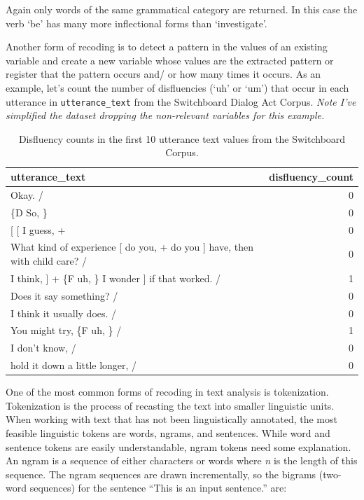 \documentclass[
]{article}
\begin{document}
Again only words of the same grammatical category are returned. In this case the verb `be' has many more inflectional forms than `investigate'.

Another form of recoding is to detect a pattern in the values of an existing variable and create a new variable whose values are the extracted pattern or register that the pattern occurs and/ or how many times it occurs. As an example, let's count the number of disfluencies (`uh' or `um') that occur in each utterance in \texttt{utterance\_text} from the Switchboard Dialog Act Corpus. \emph{Note I've simplified the dataset dropping the non-relevant variables for this example.}

\begin{table}

\caption{\label{tab:recoding-extract-switchboard}Disfluency counts in the first 10 utterance text values from the Switchboard Corpus.}
\centering
\begin{tabular}[t]{lr}
\toprule
utterance\_text & disfluency\_count\\
\midrule
Okay.  / & 0\\
\{D So, \} & 0\\
{}[ [ I guess, + & 0\\
What kind of experience [ do you, + do you ] have, then with child care? / & 0\\
I think, ] + \{F uh, \} I wonder ] if that worked. / & 1\\
\addlinespace
Does it say something? / & 0\\
I think it usually does.  / & 0\\
You might try, \{F uh, \}  / & 1\\
I don't know,  / & 0\\
hold it down a little longer,  / & 0\\
\bottomrule
\end{tabular}
\end{table}

One of the most common forms of recoding in text analysis is tokenization. Tokenization is the process of recasting the text into smaller linguistic units. When working with text that has not been linguistically annotated, the most feasible linguistic tokens are words, ngrams, and sentences. While word and sentence tokens are easily understandable, ngram tokens need some explanation. An ngram is a sequence of either characters or words where \emph{n} is the length of this sequence. The ngram sequences are drawn incrementally, so the bigrams (two-word sequences) for the sentence ``This is an input sentence.'' are:
\end{document}
